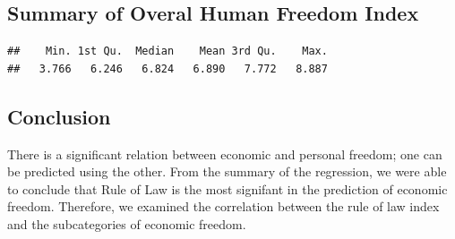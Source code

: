 \documentclass[]{article}
\begin{document}
\hypertarget{summary-of-overal-human-freedom-index}{%
\subsection{Summary of Overal Human Freedom
Index}\label{summary-of-overal-human-freedom-index}}

\begin{verbatim}
##    Min. 1st Qu.  Median    Mean 3rd Qu.    Max. 
##   3.766   6.246   6.824   6.890   7.772   8.887
\end{verbatim}

\hypertarget{conclusion}{%
\subsection{Conclusion}\label{conclusion}}

There is a significant relation between economic and personal freedom;
one can be predicted using the other. From the summary of the
regression, we were able to conclude that Rule of Law is the most
signifant in the prediction of economic freedom. Therefore, we examined
the correlation between the rule of law index and the subcategories of
economic freedom.
\end{document}
